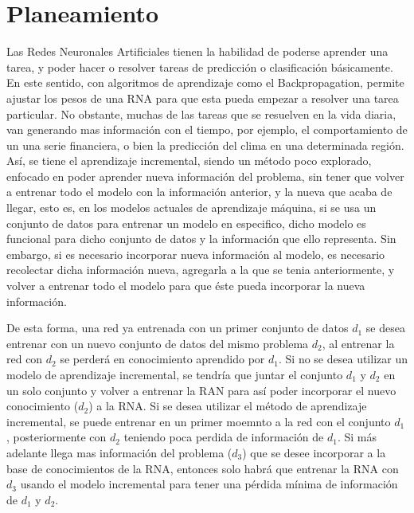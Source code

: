 \section{Planeamiento}

    Las Redes Neuronales Artificiales tienen la habilidad de poderse aprender una tarea, 
    y poder hacer o resolver tareas de predicción o clasificación básicamente. En este 
    sentido, con algoritmos de aprendizaje como el Backpropagation, permite ajustar los 
    pesos de una RNA para que esta pueda empezar a resolver una tarea particular.  No 
    obstante, muchas de las tareas que se resuelven en la vida diaria, van generando mas 
    información con el tiempo, por ejemplo, el comportamiento de un una serie financiera, 
    o bien la predicción del clima en una determinada región. Así,  se tiene el aprendizaje 
    incremental, siendo un método poco explorado,  enfocado en poder aprender nueva información del 
    problema, sin tener que volver a entrenar todo el modelo con la información anterior, y la 
    nueva que acaba de llegar, esto es, en los modelos actuales de aprendizaje máquina, si se usa 
    un conjunto de datos para entrenar un modelo en especifico, dicho modelo es funcional para 
    dicho conjunto de datos y la información que ello representa. Sin embargo, si es necesario 
    incorporar nueva información al modelo, es necesario recolectar dicha información nueva, 
    agregarla a la que se tenia anteriormente, y volver a entrenar todo el modelo para que \'este 
    pueda incorporar la nueva información.

    De esta forma, una red ya entrenada con un primer conjunto de datos $d_{1}$ se desea entrenar 
    con un nuevo conjunto de datos del mismo problema $d_{2}$, al entrenar la red con $d_{2}$ se 
    perderá en conocimiento aprendido por $d_{1}$.  Si no se desea utilizar un modelo de aprendizaje 
    incremental, se tendría que juntar el conjunto $d_{1}$ y $d_{2}$ en un solo conjunto y volver a 
    entrenar la RAN para así poder incorporar el nuevo conocimiento ($d_{2}$) a la RNA. Si se desea 
    utilizar el método de aprendizaje incremental, se puede entrenar en un primer moemnto a la red 
    con el conjunto $d_{1}$, posteriormente con $d_{2}$ teniendo poca perdida de información de $d_{1}$. 
    Si más adelante llega mas información del problema ($d_{3}$) que se desee incorporar a la base 
    de conocimientos de la RNA, entonces solo habrá que entrenar la RNA con $d_{3}$ usando el modelo 
    incremental para tener una p\'erdida mínima de información de $d_{1}$ y $d_{2}$. 

